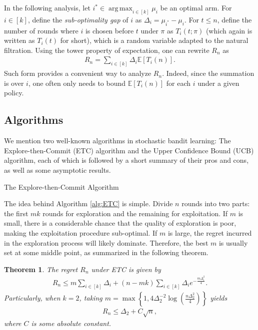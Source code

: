 \documentclass[10pt,a4article]{article}
\numberwithin{equation}{section}
\theoremstyle{plain}
\newtheorem{Th}{Theorem}[section]
\theoremstyle{definition}
\def\E{{\mathbb E}}
\DeclareMathOperator*{\argmax}{arg\,max}
\begin{document}
In the following analysis, let $i^*\in\argmax_{i\in [k]}\mu_i$ be an optimal arm. For $i\in [k]$, define the \emph{sub-optimality gap} of $i$ as $\Delta_i=\mu_{i^*}-\mu_i$. For $t\leq n$, define the number of rounds where $i$ is chosen before $t$ under $\pi$ as $T_i(t; \pi)$ (which again is written as $T_i(t)$ for short), which is a random variable adapted to the natural filtration. Using the tower property of expectation, one can rewrite $R_n$ as 
\begin{align}
R_n=\sum_{i\in [k]}\Delta_i\E[T_i(n)].\label{s:2}
\end{align} 
Such form provides a convenient way to analyze $R_n$.  Indeed, since the summation is over $i$, one often only needs to bound $\E[T_i(n)]$ for each $i$ under a given policy.  

\subsection{Algorithms}

We mention two well-known algorithms in stochastic bandit learning: The Explore-then-Commit (ETC) algorithm and the Upper Confidence Bound (UCB) algorithm, each of which is followed by a short summary of their pros and cons, as well as some asymptotic results.   

\begin{algorithm}
 \caption{The Explore-then-Commit Algorithm} 
 \begin{algorithmic}[1]
 \ELSE
 \STATE{$\pi_t = \argmax_{i\in [k]}\hat{\mu}_{i}(mk)$, where $\hat{\mu}_{i}(mk)=\frac{1}{m}\sum_{t=mi+1}^{m(i+1)}x_{t\pi_t}$}
 \ENDIF
 \ENDFOR
\end{algorithmic}
\label{alg:ETC}
\end{algorithm}


The idea behind Algorithm \ref{alg:ETC} is simple. Divide $n$ rounds into two parts: the first $mk$ rounds for exploration and the remaining for exploitation. 
If $m$ is small, there is a considerable chance that the quality of exploration is poor, making the exploitation procedure sub-optimal.  If $m$ is large, the regret incurred in the exploration process will likely dominate. Therefore, the best $m$ is usually set at some middle point, as summarized in the following theorem. 

\begin{Th}\label{thm:ETC}
The regret $R_n$ under ETC is given by
\begin{align}
R_n\leq m\sum_{i\in [k]}\Delta_i + (n-mk)\sum_{i\in [k]}\Delta_i e^{-\frac{m\Delta_i^2}{4}}.
\end{align}
Particularly, when $k=2$, taking $m=\max\left\{1, 4\Delta_2^{-2}\log\left(\frac{n\Delta_2^2}{4}\right)\right\}$ yields
\begin{align}
R_n\leq\Delta_2+C\sqrt{n},\label{ETC:opt}
\end{align}
where $C$ is some absolute constant. 
\end{Th}
\end{document}
